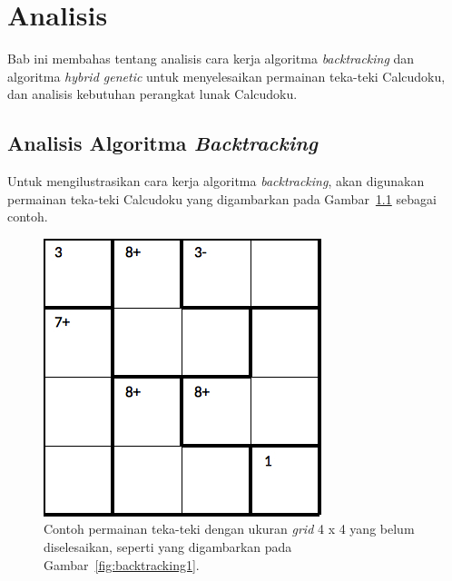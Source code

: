 \chapter{Analisis}
\label{chap:analisis}

Bab ini membahas tentang analisis cara kerja algoritma \textit{backtracking} dan algoritma \textit{hybrid genetic} untuk menyelesaikan permainan teka-teki Calcudoku, dan analisis kebutuhan perangkat lunak Calcudoku.

\section{Analisis Algoritma \textit{Backtracking}}
\label{sec:analisisbt}

Untuk mengilustrasikan cara kerja algoritma \textit{backtracking}, akan digunakan permainan teka-teki Calcudoku yang digambarkan pada Gambar~\ref{fig:analisisbt1} sebagai contoh.

\begin{figure}
\centering
\captionsetup{justification=centering}
\includegraphics[scale=0.333]{Gambar/backtracking/State1}
\caption[Contoh permainan teka-teki Calcudoku dengan ukuran \textit{grid} 4 x 4 yang belum diselesaikan, seperti yang digambarkan pada Gambar~\ref{fig:backtracking1}.  ~\cite{fahda:16:backtracking}]{Contoh permainan teka-teki dengan ukuran \textit{grid} 4 x 4 yang belum diselesaikan, seperti yang digambarkan pada Gambar~\ref{fig:backtracking1}.  ~\cite{fahda:16:backtracking}}
\label{fig:analisisbt1}
\end{figure}

